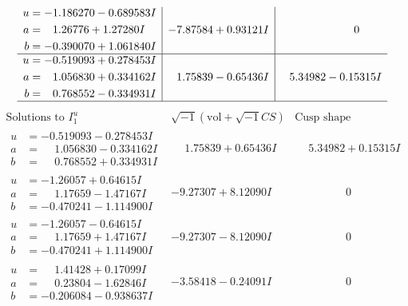 \documentclass[1p]{elsarticle_modified}
\theoremstyle{definition}
\newcommand{\I}{\sqrt{-1}}
\begin{document}
$$\begin{array}{c|c|c}
\begin{aligned}
u &= -1.186270 - 0.689583 I \\
a &= \phantom{-}1.26776 + 1.27280 I \\
b &= -0.390070 + 1.061840 I\end{aligned}
 & -7.87584 + 0.93121 I & \phantom{-0.000000 } 0 \\ \hline\begin{aligned}
u &= -0.519093 + 0.278453 I \\
a &= \phantom{-}1.056830 + 0.334162 I \\
b &= \phantom{-}0.768552 - 0.334931 I\end{aligned}
 & \phantom{-}1.75839 - 0.65436 I & \phantom{-}5.34982 - 0.15315 I\\
 \hline 
 \end{array}$$\newpage$$\begin{array}{c|c|c}  
\text{Solutions to }I^u_{1}& \I (\text{vol} + \sqrt{-1}CS) & \text{Cusp shape}\\
 \hline 
\begin{aligned}
u &= -0.519093 - 0.278453 I \\
a &= \phantom{-}1.056830 - 0.334162 I \\
b &= \phantom{-}0.768552 + 0.334931 I\end{aligned}
 & \phantom{-}1.75839 + 0.65436 I & \phantom{-}5.34982 + 0.15315 I \\ \hline\begin{aligned}
u &= -1.26057 + 0.64615 I \\
a &= \phantom{-}1.17659 - 1.47167 I \\
b &= -0.470241 - 1.114900 I\end{aligned}
 & -9.27307 + 8.12090 I & \phantom{-0.000000 } 0 \\ \hline\begin{aligned}
u &= -1.26057 - 0.64615 I \\
a &= \phantom{-}1.17659 + 1.47167 I \\
b &= -0.470241 + 1.114900 I\end{aligned}
 & -9.27307 - 8.12090 I & \phantom{-0.000000 } 0 \\ \hline\begin{aligned}
u &= \phantom{-}1.41428 + 0.17099 I \\
a &= \phantom{-}0.23804 - 1.62846 I \\
b &= -0.206084 - 0.938637 I\end{aligned}
 & -3.58418 - 0.24091 I & \phantom{-0.000000 } 0 \\ \hline\begin{aligned}

\end{aligned}
\end{array}$$
\end{document}
